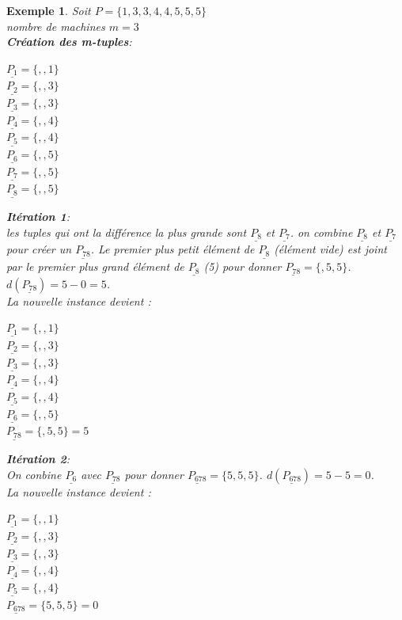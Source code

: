 \documentclass[a4paper,12pt]{report}
\theoremstyle{plain}				%
\newtheorem{example}{Exemple}
\theoremstyle{definition}				%
\begin{document}
\begin{itemize}
\begin{example}
Soit $P=\{1,3,3,4,4,5,5,5\}$\\
nombre de machines $m=3$\\
\textbf{Création des m-tuples}:\\
\begin{multicols}{3}
$\underline{P_{1}} = \{,,1\}$\\
$\underline{P_{2}} = \{,,3\}$\\
$\underline{P_{3}} = \{,,3\}$\\
$\underline{P_{4}} = \{,,4\}$\\
$\underline{P_{5}} = \{,,4\}$\\
$\underline{P_{6}} = \{,,5\}$\\
$\underline{P_{7}} = \{,,5\}$\\
$\underline{P_{8}} = \{,,5\}$\\
\end{multicols}

\textbf{Itération 1}:\\
les tuples qui ont la différence la plus grande sont
$\underline{P_{8}}$  et $\underline{P_{7}}$.
on combine $\underline{P_{8}}$  et $\underline{P_{7}}$ pour créer un $\underline{P_{78}}$. Le premier plus petit élément de $\underline{P_{8}}$ (élément vide) est joint par le premier plus grand élément de $\underline{P_{8}}$ (5) pour donner  $\underline{P_{78}} = \{,5,5\}$. $d(\underline{P_{78}}) = 5-0 = 5$.\\
La nouvelle instance devient :\\
\begin{multicols}{3}
$\underline{P_{1}} = \{,,1\}$\\
$\underline{P_{2}} = \{,,3\}$\\
$\underline{P_{3}} = \{,,3\}$\\
$\underline{P_{4}} = \{,,4\}$\\
$\underline{P_{5}} = \{,,4\}$\\
$\underline{P_{6}} = \{,,5\}$\\
$\underline{P_{78}} = \{,5,5\}=5$\\
\end{multicols}

\textbf{Itération 2}:\\
On conbine $\underline{P_{6}}$ avec $\underline{P_{78}}$ pour donner $\underline{P_{678}} = \{5,5,5\}$. $d(\underline{P_{678}}) = 5-5 = 0$.\\
La nouvelle instance devient :\\
\begin{multicols}{3}
$\underline{P_{1}} = \{,,1\}$\\
$\underline{P_{2}} = \{,,3\}$\\
$\underline{P_{3}} = \{,,3\}$\\
$\underline{P_{4}} = \{,,4\}$\\
$\underline{P_{5}} = \{,,4\}$\\
$\underline{P_{678}} = \{5,5,5\}=0$\\
\end{multicols}


\end{example}
\end{itemize}
\end{document}
